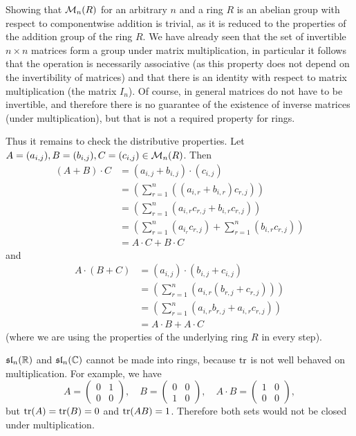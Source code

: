 \begin{solution}
	Showing that $\mathcal{M}_n(R)$ for an arbitrary $n$ and a ring $R$ is an abelian group with respect to componentwise addition is trivial, as it is reduced to the properties of the addition group of the ring $R$. We have already seen that the set of invertible $n \times n$ matrices form a group under matrix multiplication, in particular it follows that the operation is necessarily associative (as this property does not depend on the invertibility of matrices) and that there is an identity with respect to matrix multiplication (the matrix $I_n$). Of course, in general matrices do not have to be invertible, and therefore there is no guarantee of the existence of inverse matrices (under multiplication), but that is not a required property for rings.
	
	Thus it remains to check the distributive properties. Let $A = (a_{i, j}), B = (b_{i, j}), C = (c_{i, j}) \in \mathcal{M}_n(R)$. Then
	\begin{align*}
		(A + B) \cdot C &= (a_{i, j} + b_{i, j}) \cdot (c_{i, j}) \\
		&= (\sum_{r=1}^{n} ((a_{i, r} + b_{i, r}) c_{r, j})) \\
		&= (\sum_{r=1}^{n} (a_{i, r} c_{r, j} + b_{i, r} c_{r, j})) \\
		&= (\sum_{r=1}^{n} (a_{i_r} c_{r, j}) + \sum_{r=1}^{n} (b_{i, r} c_{r, j})) \\
		&= A \cdot C + B \cdot C
	\end{align*}
	and
	\begin{align*}
		A \cdot (B + C) &= (a_{i, j}) \cdot (b_{i, j} + c_{i, j}) \\
		&= (\sum_{r=1}^{n}(a_{i, r} (b_{r, j} + c_{r, j}))) \\
		&= (\sum_{r=1}^{n}(a_{i, r} b_{r, j} + a_{i, r} c_{r, j})) \\
		&= A \cdot B + A \cdot C
	\end{align*}
	(where we are using the properties of the underlying ring $R$ in every step).
	
	$\mathfrak{sl}_n(\mathbb{R})$ and $\mathfrak{sl}_n(\mathbb{C})$ cannot be made into rings, because $\operatorname{tr}$ is not well behaved on multiplication. For example, we have
	\[
		A =
		\begin{pmatrix}
			0 & 1 \\
			0 & 0
		\end{pmatrix}, \quad
		B =
		\begin{pmatrix}
			0 & 0 \\
			1 & 0
		\end{pmatrix}, \quad
		A \cdot B =
		\begin{pmatrix}
			1 & 0 \\
			0 & 0
		\end{pmatrix},
	\]
	but $\operatorname{tr}(A) = \operatorname{tr}(B) = 0$ and $\operatorname{tr}(AB) = 1$. Therefore both sets would not be closed under multiplication.
	

\end{solution}
